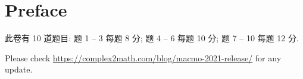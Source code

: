 \documentclass[10pt]{article}
\begin{document}


{}
\section*{Preface}

此卷有 10 道题目:
题 1 -- 3 每题 8 分;
题 4 -- 6 每题 10 分;
题 7 -- 10 每题 12 分.

\bigskip

Please check \url{https://complex2math.com/blog/macmo-2021-release/} for any update.

\newpage




















\end{document}
